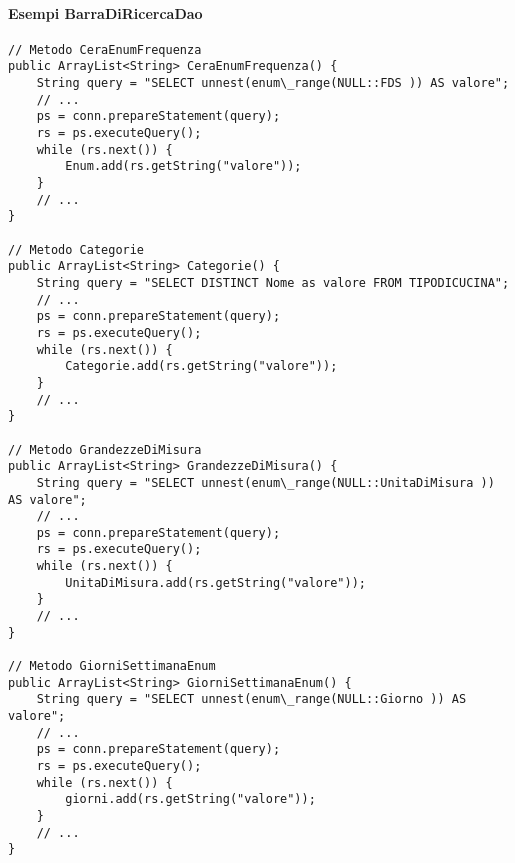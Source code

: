 \paragraph{Esempi BarraDiRicercaDao}
\begin{verbatim}
// Metodo CeraEnumFrequenza
public ArrayList<String> CeraEnumFrequenza() {
    String query = "SELECT unnest(enum\_range(NULL::FDS )) AS valore";
    // ...
    ps = conn.prepareStatement(query);
    rs = ps.executeQuery();
    while (rs.next()) {
        Enum.add(rs.getString("valore"));
    }
    // ...
}

// Metodo Categorie
public ArrayList<String> Categorie() {
    String query = "SELECT DISTINCT Nome as valore FROM TIPODICUCINA";
    // ...
    ps = conn.prepareStatement(query);
    rs = ps.executeQuery();
    while (rs.next()) {
        Categorie.add(rs.getString("valore"));
    }
    // ...
}

// Metodo GrandezzeDiMisura
public ArrayList<String> GrandezzeDiMisura() {
    String query = "SELECT unnest(enum\_range(NULL::UnitaDiMisura )) AS valore";
    // ...
    ps = conn.prepareStatement(query);
    rs = ps.executeQuery();
    while (rs.next()) {
        UnitaDiMisura.add(rs.getString("valore"));
    }
    // ...
}

// Metodo GiorniSettimanaEnum
public ArrayList<String> GiorniSettimanaEnum() {
    String query = "SELECT unnest(enum\_range(NULL::Giorno )) AS valore";
    // ...
    ps = conn.prepareStatement(query);
    rs = ps.executeQuery();
    while (rs.next()) {
        giorni.add(rs.getString("valore"));
    }
    // ...
}
\end{verbatim}